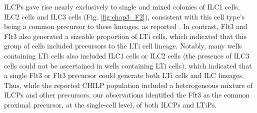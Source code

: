 ILCPs gave rise nearly exclusively to single and mixed colonies of ILC1 cells, ILC2 cells and ILC3 cells (Fig. \ref{fig:chap3_F2}), consistent with this cell type's being a common precursor to these lineages, as reported \cite{constantinides2014}. In contrast, Flt3\UP{} and Flt3\UM{} \aLPs also generated a sizeable proportion of LTi cells, which indicated that this group of cells included precursors to the LTi cell lineage. Notably, many wells containing LTi cells also included ILC1 cells or ILC2 cells (the presence of ILC3 cells could not be ascertained in wells containing LTi cells), which indicated that a single Flt3\UP{} or Flt3\UM{} \aLP precursor could generate both LTi cells and ILC lineages. Thus, while the reported CHILP population \cite{klose2014} included a heterogeneous mixture of ILCPs and other precursors, our observations identified the Flt3\UM{} \aLP as the common proximal precursor, at the single-cell level, of both ILCPs and LTiPs.


